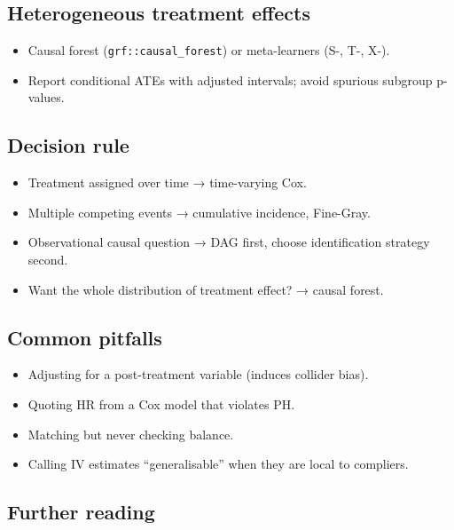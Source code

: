 \documentclass[
]{article}
\providecommand{\tightlist}{%
  \setlength{\itemsep}{0pt}\setlength{\parskip}{0pt}}
\begin{document}
\subsection{Heterogeneous treatment
effects}\label{heterogeneous-treatment-effects}

\begin{itemize}
\tightlist
\item
  Causal forest (\texttt{grf::causal\_forest}) or meta-learners (S-, T-,
  X-).
\item
  Report conditional ATEs with adjusted intervals; avoid spurious
  subgroup p-values.
\end{itemize}

\subsection{Decision rule}\label{decision-rule-10}

\begin{itemize}
\tightlist
\item
  Treatment assigned over time → time-varying Cox.
\item
  Multiple competing events → cumulative incidence, Fine-Gray.
\item
  Observational causal question → DAG first, choose identification
  strategy second.
\item
  Want the whole distribution of treatment effect? → causal forest.
\end{itemize}

\subsection{Common pitfalls}\label{common-pitfalls-10}

\begin{itemize}
\tightlist
\item
  Adjusting for a post-treatment variable (induces collider bias).
\item
  Quoting HR from a Cox model that violates PH.
\item
  Matching but never checking balance.
\item
  Calling IV estimates ``generalisable'' when they are local to
  compliers.
\end{itemize}

\subsection{Further reading}\label{further-reading-10}
\end{document}
